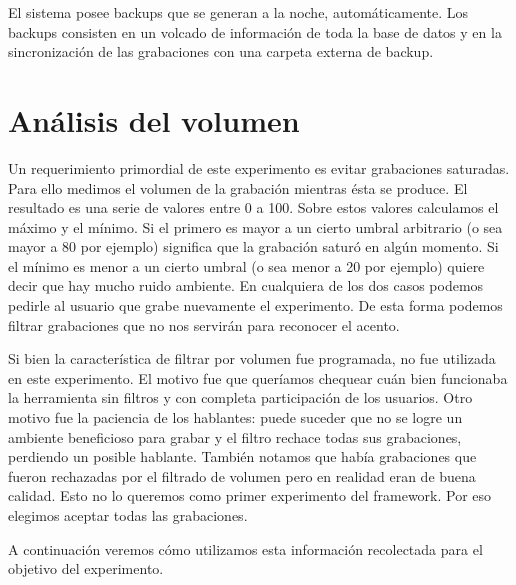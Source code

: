 El sistema posee backups que se generan a la noche, automáticamente. Los backups consisten en un volcado de información de toda la base de datos y en la sincronización de las grabaciones con una carpeta externa de backup.

\section{Análisis del volumen}

Un requerimiento primordial de este experimento es evitar grabaciones saturadas. Para ello medimos el volumen de la grabación mientras ésta se produce. El resultado es una serie de valores entre 0 a 100. Sobre estos valores calculamos el máximo y el mínimo. Si el primero es mayor a un cierto umbral arbitrario (o sea mayor a 80 por ejemplo) significa que la grabación saturó en algún momento. Si el mínimo es menor a un cierto umbral (o sea menor a 20 por ejemplo) quiere decir que hay mucho ruido ambiente. En cualquiera de los dos casos podemos pedirle al usuario que grabe nuevamente el experimento. De esta forma podemos filtrar grabaciones que no nos servirán para reconocer el acento.

Si bien la característica de filtrar por volumen fue programada, no fue utilizada en este experimento. El motivo fue que queríamos chequear cuán bien funcionaba la herramienta sin filtros y con completa participación de los usuarios. Otro motivo fue la paciencia de los hablantes: puede suceder que no se logre un ambiente beneficioso para grabar y el filtro rechace todas sus grabaciones, perdiendo un posible hablante. También notamos que había grabaciones que fueron rechazadas por el filtrado de volumen pero en realidad eran de buena calidad. Esto no lo queremos como primer experimento del framework. Por eso elegimos aceptar todas las grabaciones.

A continuación veremos cómo utilizamos esta información recolectada para el objetivo del experimento.